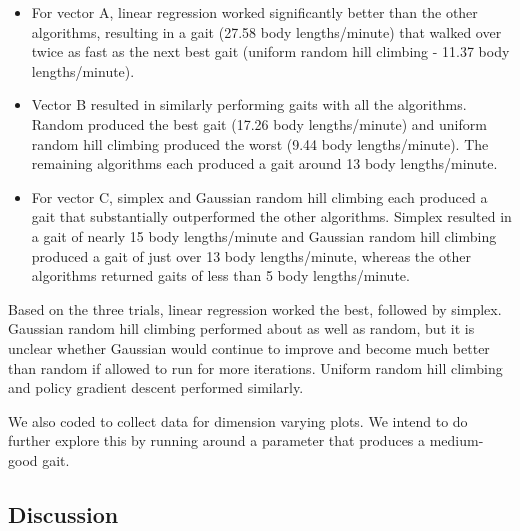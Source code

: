 \begin{itemize}

\item For vector A, linear regression worked significantly better than the other algorithms, resulting in a gait (27.58 body lengths/minute) that walked over twice as fast as the next best gait (uniform random hill climbing - 11.37 body lengths/minute).

\item Vector B resulted in similarly performing gaits with all the algorithms. Random produced the best gait (17.26 body lengths/minute) and uniform random hill climbing produced the worst (9.44 body lengths/minute). The remaining algorithms each produced a gait around 13 body lengths/minute.

\item For vector C, simplex and Gaussian random hill climbing each produced a gait that substantially outperformed the other algorithms. Simplex resulted in a gait of nearly 15 body lengths/minute  and Gaussian random hill climbing produced a gait of just over 13 body lengths/minute, whereas the other algorithms returned gaits of less than 5 body lengths/minute.

\end{itemize}

Based on the three trials, linear regression worked the best, followed by simplex. Gaussian random hill climbing performed about as well as random, but it is unclear whether Gaussian would continue to improve and become much better than random if allowed to run for more iterations. Uniform random hill climbing and policy gradient descent performed similarly.

We also coded  to collect data for dimension
varying plots. We intend to do further explore this by running
 around a parameter that produces a medium-good gait.










\subsection{Discussion}

